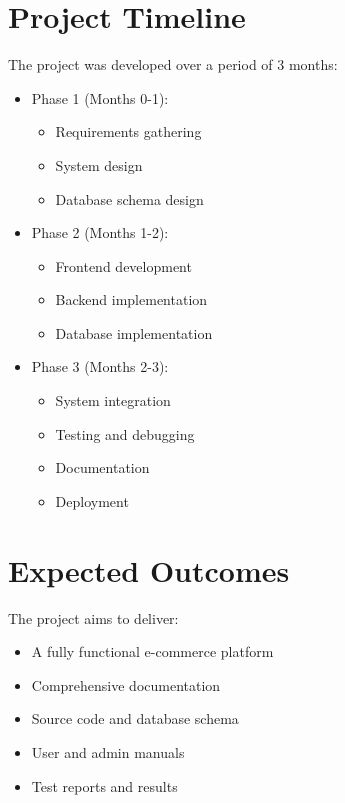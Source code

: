 \section{Project Timeline}
The project was developed over a period of 3 months:
\begin{itemize}
    \item Phase 1 (Months 0-1):
    \begin{itemize}
        \item Requirements gathering
        \item System design
        \item Database schema design
    \end{itemize}
    \item Phase 2 (Months 1-2):
    \begin{itemize}
        \item Frontend development
        \item Backend implementation
        \item Database implementation
    \end{itemize}
    \item Phase 3 (Months 2-3):
    \begin{itemize}
        \item System integration
        \item Testing and debugging
        \item Documentation
        \item Deployment
    \end{itemize}
\end{itemize}

\section{Expected Outcomes}
The project aims to deliver:
\begin{itemize}
    \item A fully functional e-commerce platform
    \item Comprehensive documentation
    \item Source code and database schema
    \item User and admin manuals
    \item Test reports and results
\end{itemize}


